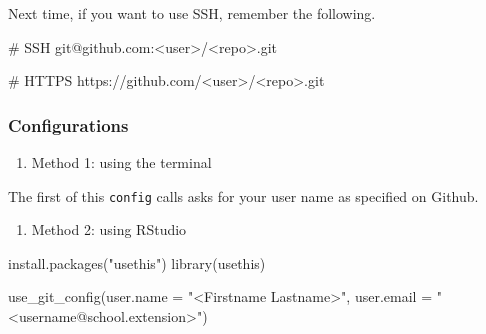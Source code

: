\documentclass[
  letterpaper,
  DIV=11,
  numbers=noendperiod]{scrreprt}
\newenvironment{Shaded}{\begin{snugshade}}{\end{snugshade}}
\newcommand{\AttributeTok}[1]{\textcolor[rgb]{0.40,0.45,0.13}{#1}}
\newcommand{\CommentTok}[1]{\textcolor[rgb]{0.37,0.37,0.37}{#1}}
\newcommand{\ExtensionTok}[1]{\textcolor[rgb]{0.00,0.23,0.31}{#1}}
\newcommand{\FunctionTok}[1]{\textcolor[rgb]{0.28,0.35,0.67}{#1}}
\newcommand{\NormalTok}[1]{\textcolor[rgb]{0.00,0.23,0.31}{#1}}
\newcommand{\OperatorTok}[1]{\textcolor[rgb]{0.37,0.37,0.37}{#1}}
\newcommand{\StringTok}[1]{\textcolor[rgb]{0.13,0.47,0.30}{#1}}
\providecommand{\tightlist}{%
  \setlength{\itemsep}{0pt}\setlength{\parskip}{0pt}}\usepackage{longtable,booktabs,array}
\begin{document}
Next time, if you want to use SSH, remember the following.

\begin{Shaded}
\begin{Highlighting}[]
\CommentTok{\# SSH}
\ExtensionTok{git@github.com:}\OperatorTok{\textless{}}\NormalTok{user}\OperatorTok{\textgreater{}}\NormalTok{/}\OperatorTok{\textless{}}\NormalTok{repo}\OperatorTok{\textgreater{}}\NormalTok{.git}

\CommentTok{\# HTTPS}
\ExtensionTok{https://github.com/}\OperatorTok{\textless{}}\NormalTok{user}\OperatorTok{\textgreater{}}\NormalTok{/}\OperatorTok{\textless{}}\NormalTok{repo}\OperatorTok{\textgreater{}}\NormalTok{.git}
\end{Highlighting}
\end{Shaded}

\hypertarget{configurations}{%
\subsubsection*{Configurations}\label{configurations}}

\begin{enumerate}
\def\labelenumi{\arabic{enumi}.}
\tightlist
\item
  Method 1: using the terminal
\end{enumerate}

\begin{Shaded}
\end{Shaded}

The first of this \texttt{config} calls asks for your user name as
specified on Github.

\begin{enumerate}
\def\labelenumi{\arabic{enumi}.}
\setcounter{enumi}{1}
\tightlist
\item
  Method 2: using RStudio
\end{enumerate}

\begin{Shaded}
\begin{Highlighting}[]
\FunctionTok{install.packages}\NormalTok{(}\StringTok{"usethis"}\NormalTok{)}
\FunctionTok{library}\NormalTok{(usethis)}

\FunctionTok{use\_git\_config}\NormalTok{(}\AttributeTok{user.name =} \StringTok{"\textless{}Firstname Lastname\textgreater{}"}\NormalTok{,}
               \AttributeTok{user.email =} \StringTok{"\textless{}username@school.extension\textgreater{}"}\NormalTok{)}
\end{Highlighting}
\end{Shaded}
\end{document}
